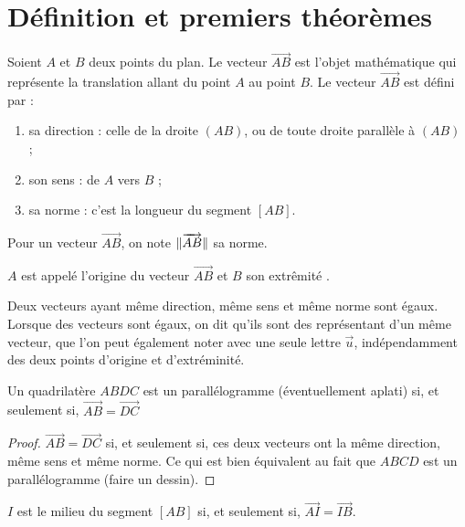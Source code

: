 \documentclass[a4paper, 12pt]{report}
\begin{document}
\section{Définition et premiers théorèmes}

\begin{defn}[Vecteur]
Soient $A$ et $B$ deux points du plan. Le vecteur $\vec{AB}$ est l'objet mathématique qui représente la translation allant du point 
$A$ au point $B$. Le vecteur $\vec{AB}$ est défini par :
\begin{enumerate}[label=(\roman*)]
\item sa direction : celle de la droite $(AB)$, ou de toute droite parallèle à $(AB)$ ;
\item son sens : de $A$ vers $B$ ;
\item sa norme : c'est la longueur du segment $[AB]$.
\end{enumerate}
\end{defn}

\begin{nota}
Pour un vecteur $\vec{AB}$, on note $\lVert\overrightarrow{AB}\rVert$ sa norme.
\end{nota}

\begin{rmq}
$A$ est appelé \og l'origine \fg{} du vecteur $\vec{AB}$ et $B$ son \og extrêmité \fg.
\end{rmq}

\begin{defn}
Deux vecteurs ayant même direction, même sens et même norme sont égaux.
Lorsque des vecteurs sont égaux, on dit qu'ils sont des représentant d'un même vecteur, que l'on peut également noter avec une 
seule lettre $\vec{u}$, indépendamment des deux points d'origine et d'extréminité.
\end{defn}

\begin{thm}
Un quadrilatère $ABDC$ est un parallélogramme (éventuellement aplati) si, et seulement si, $\vec{AB} = \vec{DC}$
\end{thm}

\begin{proof}
$\vec{AB} = \vec{DC}$ si, et seulement si, ces deux vecteurs ont la même direction, même sens et même norme. Ce qui est bien 
équivalent au fait que $ABCD$ est un parallélogramme (faire un dessin).
\end{proof}

\begin{thm}
$I$ est le milieu du segment $[AB]$ si, et seulement si, $\vec{AI} = \vec{IB}$.
\end{thm}
\end{document}
